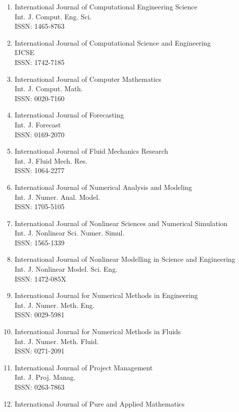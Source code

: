 \begin{enumerate}
\item
 International Journal of Computational Engineering Science\\
 Int. J. Comput. Eng. Sci.\\
 ISSN: 1465-8763
\item
 International Journal of Computational Science and Engineering\\
 IJCSE\\
 ISSN: 1742-7185
\item
 International Journal of Computer Mathematics\\
 Int. J. Comput. Math.\\
 ISSN: 0020-7160
\item
 International Journal of Forecasting\\
 Int. J. Forecast\\
 ISSN: 0169-2070
\item
 International Journal of Fluid Mechanics Research\\
 Int. J. Fluid Mech. Res.\\
 ISSN: 1064-2277
\item
 International Journal of Numerical Analysis and Modeling\\
 Int. J. Numer. Anal. Model.\\
 ISSN: 1705-5105
\item
 International Journal of Nonlinear Sciences and Numerical Simulation\\
 Int. J. Nonlinear Sci. Numer. Simul.\\
 ISSN: 1565-1339
\item
 International Journal of Nonlinear Modelling in Science and Engineering\\
 Int. J. Nonlinear Model. Sci. Eng.\\
 ISSN: 1472-085X
\item
 International Journal for Numerical Methods in Engineering\\
 Int. J. Numer. Meth. Eng.\\
 ISSN: 0029-5981
\item
 International Journal for Numerical Methods in Fluids\\
 Int. J. Numer. Meth. Fluid.\\
 ISSN: 0271-2091
\item
 International Journal of Project Management\\
 Int. J. Proj. Manag.\\
 ISSN: 0263-7863
\item
 International Journal of Pure and Applied Mathematics\\

\end{enumerate}
